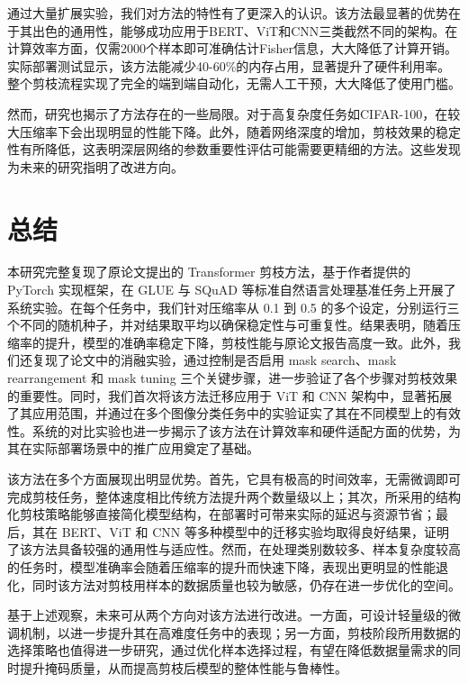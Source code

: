 \documentclass[UTF8,openany]{ctexbook}
\begin{document}
通过大量扩展实验，我们对方法的特性有了更深入的认识。该方法最显著的优势在于其出色的通用性，能够成功应用于BERT、ViT和CNN三类截然不同的架构。在计算效率方面，仅需2000个样本即可准确估计Fisher信息，大大降低了计算开销。实际部署测试显示，该方法能减少40-60\%的内存占用，显著提升了硬件利用率。整个剪枝流程实现了完全的端到端自动化，无需人工干预，大大降低了使用门槛。

然而，研究也揭示了方法存在的一些局限。对于高复杂度任务如CIFAR-100，在较大压缩率下会出现明显的性能下降。此外，随着网络深度的增加，剪枝效果的稳定性有所降低，这表明深层网络的参数重要性评估可能需要更精细的方法。这些发现为未来的研究指明了改进方向。

\chapter{总结}
本研究完整复现了原论文提出的 Transformer 剪枝方法，基于作者提供的 PyTorch 实现框架，在 GLUE 与 SQuAD 等标准自然语言处理基准任务上开展了系统实验。在每个任务中，我们针对压缩率从 0.1 到 0.5 的多个设定，分别运行三个不同的随机种子，并对结果取平均以确保稳定性与可重复性。结果表明，随着压缩率的提升，模型的准确率稳定下降，剪枝性能与原论文报告高度一致。此外，我们还复现了论文中的消融实验，通过控制是否启用 mask search、mask rearrangement 和 mask tuning 三个关键步骤，进一步验证了各个步骤对剪枝效果的重要性。同时，我们首次将该方法迁移应用于 ViT 和 CNN 架构中，显著拓展了其应用范围，并通过在多个图像分类任务中的实验证实了其在不同模型上的有效性。系统的对比实验也进一步揭示了该方法在计算效率和硬件适配方面的优势，为其在实际部署场景中的推广应用奠定了基础。

该方法在多个方面展现出明显优势。首先，它具有极高的时间效率，无需微调即可完成剪枝任务，整体速度相比传统方法提升两个数量级以上；其次，所采用的结构化剪枝策略能够直接简化模型结构，在部署时可带来实际的延迟与资源节省；最后，其在 BERT、ViT 和 CNN 等多种模型中的迁移实验均取得良好结果，证明了该方法具备较强的通用性与适应性。然而，在处理类别数较多、样本复杂度较高的任务时，模型准确率会随着压缩率的提升而快速下降，表现出更明显的性能退化，同时该方法对剪枝用样本的数据质量也较为敏感，仍存在进一步优化的空间。

基于上述观察，未来可从两个方向对该方法进行改进。一方面，可设计轻量级的微调机制，以进一步提升其在高难度任务中的表现；另一方面，剪枝阶段所用数据的选择策略也值得进一步研究，通过优化样本选择过程，有望在降低数据量需求的同时提升掩码质量，从而提高剪枝后模型的整体性能与鲁棒性。
\newpage


\end{document}
